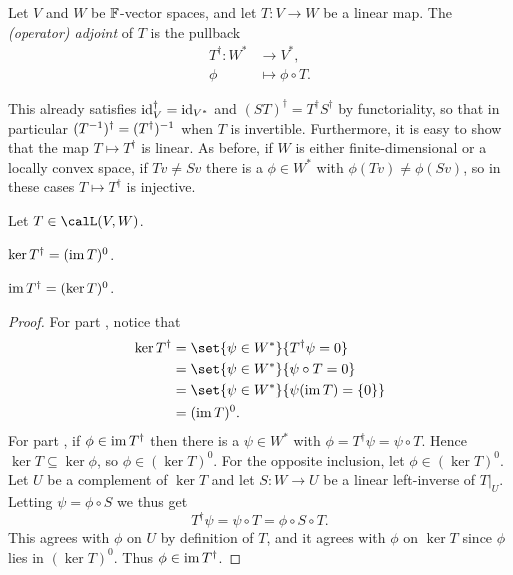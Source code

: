 \begin{definition}
    Let $V$ and $W$ be $\mathbb{F}$-vector spaces, and let $T \colon V \to W$ be a linear map. The \emph{(operator) adjoint} of $T$ is the pullback
    \begin{align*}
        T^\dagger \colon W^* &\to V^*, \\
        \phi &\mapsto \phi \circ T.
    \end{align*}
\end{definition}
%
This already satisfies $\operatorname{id}_V^\dagger = \operatorname{id}_{V^*}$ and $(ST)^\dagger = T^\dagger S^\dagger$ by functoriality, so that in particular $(T^{-1})^\dagger = (T^\dagger)^{-1}$ when $T$ is invertible. Furthermore, it is easy to show that the map $T \mapsto T^\dagger$ is linear. As before, if $W$ is either finite-dimensional or a locally convex space, if $Tv \neq Sv$ there is a $\phi \in W^*$ with $\phi(Tv) \neq \phi(Sv)$, so in these cases $T \mapsto T^\dagger$ is injective.


\begin{proposition}
    \label{prop:operator-adjoint-kernel-image}
    Let $T \in \lin(V,W)$.
    \begin{enumproposition}
        \item \label{enum:operator-adjoint-kernel} $\ker T^\dagger = (\operatorname{im} T)^0$.
        \item \label{enum:operator-adjoint-image} $\operatorname{im} T^\dagger = (\ker T)^0$.
    \end{enumproposition}
\end{proposition}

\begin{proof}
    For part , notice that
    \begin{align*}
        \ker T^\dagger
            &= \set{\psi \in W^*}{T^\dagger \psi = 0} \\
            &= \set{\psi \in W^*}{\psi \circ T = 0} \\
            &= \set{\psi \in W^*}{\psi(\im T) = \{0\}} \\
            &= (\im T)^0.
    \end{align*}
    For part , if $\phi \in \im T^\dagger$ then there is a $\psi \in W^*$ with $\phi = T^\dagger \psi = \psi \circ T$. Hence $\ker T \subseteq \ker \phi$, so $\phi \in (\ker T)^0$. For the opposite inclusion, let $\phi \in (\ker T)^0$. Let $U$ be a complement of $\ker T$ and let $S \colon W \to U$ be a linear left-inverse of $T|_U$. Letting $\psi = \phi \circ S$ we thus get
    \begin{equation*}
        T^\dagger \psi
            = \psi \circ T
            = \phi \circ S \circ T.
    \end{equation*}
    This agrees with $\phi$ on $U$ by definition of $T$, and it agrees with $\phi$ on $\ker T$ since $\phi$ lies in $(\ker T)^0$. Thus $\phi \in \im T^\dagger$.
\end{proof}


